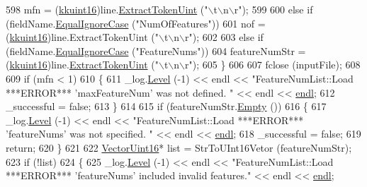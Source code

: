 \begin{DoxyCode}
598       mfn = (\hyperlink{namespace_k_k_b_aa8c7d4d30381c8a0b6fce68974a9c8a9}{kkuint16})line.\hyperlink{class_k_k_b_1_1_k_k_str_a7f1ec5a57738b6e5123f24492ac0a1b1}{ExtractTokenUint} (\textcolor{stringliteral}{"\(\backslash\)t\(\backslash\)n\(\backslash\)r"});
599 
600     \textcolor{keywordflow}{else} \textcolor{keywordflow}{if}  (fieldName.\hyperlink{class_k_k_b_1_1_k_k_str_a562f9696417c53f66bc4088eac072ab5}{EqualIgnoreCase} (\textcolor{stringliteral}{"NumOfFeatures"}))
601       nof = (\hyperlink{namespace_k_k_b_aa8c7d4d30381c8a0b6fce68974a9c8a9}{kkuint16})line.ExtractTokenUint (\textcolor{stringliteral}{"\(\backslash\)t\(\backslash\)n\(\backslash\)r"});
602 
603     \textcolor{keywordflow}{else} \textcolor{keywordflow}{if}  (fieldName.\hyperlink{class_k_k_b_1_1_k_k_str_a562f9696417c53f66bc4088eac072ab5}{EqualIgnoreCase} (\textcolor{stringliteral}{"FeatureNums"}))
604       featureNumStr = (\hyperlink{namespace_k_k_b_aa8c7d4d30381c8a0b6fce68974a9c8a9}{kkuint16})line.\hyperlink{class_k_k_b_1_1_k_k_str_a7f1ec5a57738b6e5123f24492ac0a1b1}{ExtractTokenUint} (\textcolor{stringliteral}{"\(\backslash\)t\(\backslash\)n\(\backslash\)r"});
605   \}
606 
607   fclose (inputFile);
608   
609   \textcolor{keywordflow}{if}  (mfn < 1)
610   \{
611     \_log.\hyperlink{class_k_k_b_1_1_run_log_a32cf761d7f2e747465fd80533fdbb659}{Level} (-1) << endl << \textcolor{stringliteral}{"FeatureNumList::Load   ***ERROR***   'maxFeatureNum'  was not defined.
      "}  << endl << \hyperlink{namespace_k_k_b_ad1f50f65af6adc8fa9e6f62d007818a8}{endl};
612     \_successful = \textcolor{keyword}{false};
613   \}
614 
615   \textcolor{keywordflow}{if}  (featureNumStr.\hyperlink{class_k_k_b_1_1_k_k_str_ac69942f73fffd672ec2a6e1c410afdb6}{Empty} ())
616   \{
617     \_log.\hyperlink{class_k_k_b_1_1_run_log_a32cf761d7f2e747465fd80533fdbb659}{Level} (-1) << endl << \textcolor{stringliteral}{"FeatureNumList::Load   ***ERROR***   'featureNums'  was not specified.
      "}  << endl << \hyperlink{namespace_k_k_b_ad1f50f65af6adc8fa9e6f62d007818a8}{endl};
618     \_successful = \textcolor{keyword}{false};
619     \textcolor{keywordflow}{return};
620   \}
621 
622   \hyperlink{namespace_k_k_b_a4f57cb1872dd1448f1e20798475afc06}{VectorUint16}*  list = StrToUInt16Vetor (featureNumStr);
623   \textcolor{keywordflow}{if}  (!list)
624   \{
625     \_log.\hyperlink{class_k_k_b_1_1_run_log_a32cf761d7f2e747465fd80533fdbb659}{Level} (-1) << endl << \textcolor{stringliteral}{"FeatureNumList::Load   ***ERROR***   'featureNums'  included invalid
       features."}  << endl << \hyperlink{namespace_k_k_b_ad1f50f65af6adc8fa9e6f62d007818a8}{endl};

\end{DoxyCode}
